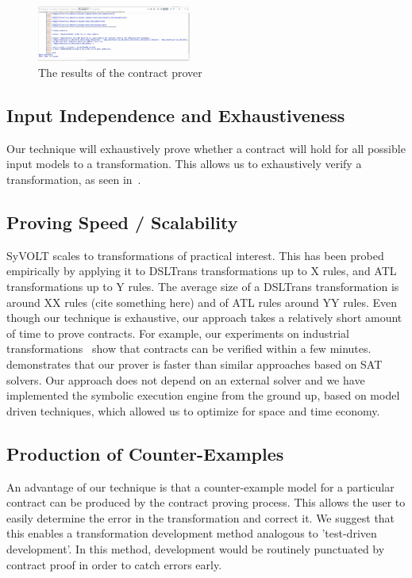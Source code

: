 \begin{figure}
\centering
\includegraphics[width=0.45\textwidth]{figures/output}
\caption{The results of the contract prover}
\label{fig:output}
\end{figure}

\subsection{Input Independence and Exhaustiveness}

Our technique will exhaustively prove whether a contract will hold for all
possible input models to a transformation. This allows us to exhaustively verify
a transformation, as seen in~\cite{Lucio2014}.

\subsection{Proving Speed / Scalability}

SyVOLT scales to transformations of practical interest. This has been probed
empirically by applying it to DSLTrans transformations up to X rules, and ATL
transformations up to Y rules. The average size of a DSLTrans transformation is
around XX rules (cite something here) and of ATL rules around YY rules. Even
though our technique is exhaustive, our approach takes a relatively short amount
of time to prove contracts. For example, our experiments on industrial
transformations~\cite{Oakes} show that contracts can be verified within a few
minutes. \cite{Selim2014} demonstrates that our prover is faster than similar
approaches based on SAT solvers. Our approach does not depend on an external
solver and we have implemented the symbolic execution engine from the ground up,
based on model driven techniques, which allowed us to optimize for space and
time economy.

\subsection{Production of Counter-Examples}

An advantage of our technique is that a counter-example model for a particular
contract can be produced by the contract proving process. This allows the user
to easily determine the error in the transformation and correct it. We suggest
that this enables a transformation development method analogous to 'test-driven
development'. In this method, development would be routinely punctuated by
contract proof in order to catch errors early.

 